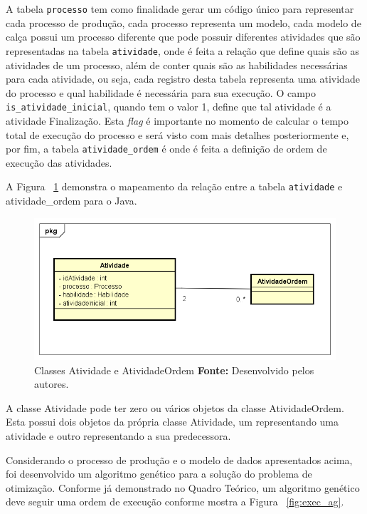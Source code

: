 \par A tabela \texttt{processo} tem como finalidade gerar um código único para representar 
cada processo de produção, cada processo representa um modelo, cada modelo
de calça possui um processo diferente que pode possuir diferentes atividades que
são representadas na tabela \texttt{atividade}, onde é feita a relação que define quais são as atividades de 
um processo,  além de conter quais são as habilidades necessárias para cada atividade, ou seja, cada registro desta 
tabela representa uma atividade do processo e qual habilidade é necessária para sua execução. O campo 
\texttt{is\_atividade\_inicial}, quando tem o valor 1, define que tal atividade
é a atividade Finalização. Esta \textit{flag} é importante no momento de calcular o tempo total de execução do
processo e será visto com mais detalhes posteriormente e, por fim, a tabela
\texttt{atividade\_ordem} é onde é feita a definição de ordem de execução das
atividades.

\par A Figura ~\ref{fig:class_atividadeOrdem} demonstra o mapeamento da relação
entre a tabela \texttt{atividade} e atividade\_ordem para o Java.

\newpage

\begin{figure}[h!]
	\centerline{\includegraphics[scale=0.7]{./imagens/atividade_diagram.png}}
	\caption[Classes Atividade e AtividadeOrdem]
	{Classes Atividade e AtividadeOrdem \textbf{Fonte:} Desenvolvido pelos
	autores.}
	\label{fig:class_atividadeOrdem}
\end{figure} 

\par A classe Atividade pode ter zero ou vários objetos da classe
AtividadeOrdem.
Esta possui dois objetos da própria classe Atividade, um representando uma
atividade e outro representando a sua predecessora.

\par Considerando o processo de produção e o modelo de dados apresentados acima, foi
desenvolvido um algoritmo genético para a solução do problema de otimização. Conforme já demonstrado 
no Quadro Teórico, um algoritmo genético deve seguir uma ordem de execução conforme mostra
a Figura ~\ref{fig:exec_ag}.


